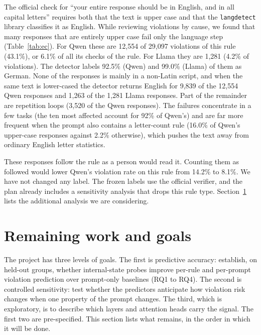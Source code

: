 \documentclass[10pt]{article}
\begin{document}
The official check for ``your entire response should be in English, and in all capital letters'' requires both that the
text is upper case and that the \texttt{langdetect} library classifies it as English. While reviewing violations by
cause, we found that many responses that are entirely upper case fail only the language step (Table~\ref{tab:ec}). For
Qwen these are 12,554 of 29,097 violations of this rule (43.1\%), or 6.1\% of all its checks of the rule. For Llama they
are 1,281 (4.2\% of violations). The detector labels 92.5\% (Qwen) and 99.0\% (Llama) of them as German. None of the
responses is mainly in a non-Latin script, and when the same text is lower-cased the detector returns English for 9,839
of the 12,554 Qwen responses and 1,263 of the 1,281 Llama responses. Part of the remainder are repetition loops (3,520
of the Qwen responses). The failures concentrate in a few tasks (the ten most affected account for 92\% of Qwen's) and
are far more frequent when the prompt also contains a letter-count rule (16.0\% of Qwen's upper-case responses against
2.2\% otherwise), which pushes the text away from ordinary English letter statistics.

These responses follow the rule as a person would read it. Counting them as followed would lower Qwen's violation rate
on this rule from 14.2\% to 8.1\%. We have not changed any label. The frozen labels use the official verifier, and the
plan already includes a sensitivity analysis that drops this rule type. Section~\ref{sec:next} lists the additional
analysis we are considering.

\section{Remaining work and goals}
\label{sec:next}

The project has three levels of goals. The first is predictive accuracy: establish, on held-out groups, whether
internal-state probes improve per-rule and per-prompt violation prediction over prompt-only baselines (RQ1 to RQ4). The
second is controlled sensitivity: test whether the predictors anticipate how violation risk changes when one property
of the prompt changes. The third, which is exploratory, is to describe which layers and attention heads carry the
signal. The first two are pre-specified. This section lists what remains, in the order in which it will be done.
\end{document}
